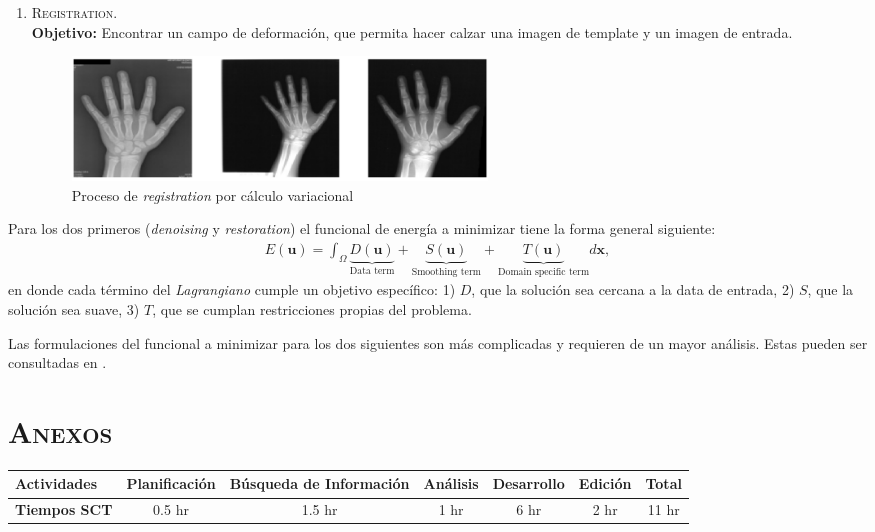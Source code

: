 \documentclass[letter, 11pt]{article}
\begin{document}
\begin{enumerate}
    \item \textsc{Registration}. \\ \textbf{Objetivo:} Encontrar un campo de deformación, que permita hacer calzar una imagen de template y un imagen de entrada.
    \begin{figure}[htpb!]
    \centering
    \includegraphics[width=11cm]{registration}
    \caption{Proceso de \textit{registration} por cálculo variacional}
    \label{fig:dendro}
    \end{figure}
\end{enumerate}

Para los dos primeros (\textit{denoising} y \textit{restoration}) el funcional de energía a minimizar tiene la forma general siguiente:
\begin{align}
    E(\mathbf{u}) = \int_{\Omega} \underbrace{D(\mathbf{u})}_{\text{Data term}} + \underbrace{S(\mathbf{u})}_{\text{Smoothing term}} + \underbrace{T(\mathbf{u})}_{\text{Domain specific term}} d\mathbf{x},
\end{align}
en donde cada término del \textit{Lagrangiano} cumple un objetivo específico: 1) $D$, que la solución sea cercana a la data de entrada, 2) $S$, que la solución sea suave, 3) $T$, que se cumplan restricciones propias del problema.

Las formulaciones del funcional a minimizar para los dos siguientes son más complicadas y requieren de un mayor análisis. Estas pueden ser consultadas en \cite{Aubert}.



\newpage
{}



\newpage

\section*{\textsc{Anexos}}

\vspace{0.5cm}

\begin{table}[htpb!]
\centering
\label{my-label}
\begin{tabular}{|l|l|l|l|l|l|l|}
\hline
\rowcolor[HTML]{329A9D} 
{\color[HTML]{000000} \textbf{Actividades}} & {\color[HTML]{000000} Planificación} & {\color[HTML]{000000} Búsqueda de Información} & {\color[HTML]{000000} Análisis} & {\color[HTML]{000000} Desarrollo} & {\color[HTML]{000000} Edición} & {\color[HTML]{000000} Total} \\ \hline
\textbf{Tiempos SCT}                        & \multicolumn{1}{c|}{0.5 hr}          & \multicolumn{1}{c|}{1.5 hr}                    & \multicolumn{1}{c|}{1 hr}       & \multicolumn{1}{c|}{6 hr}         & \multicolumn{1}{c|}{2 hr}      & \multicolumn{1}{c|}{11 hr}  \\ \hline
\end{tabular}
\end{table}
\end{document}
